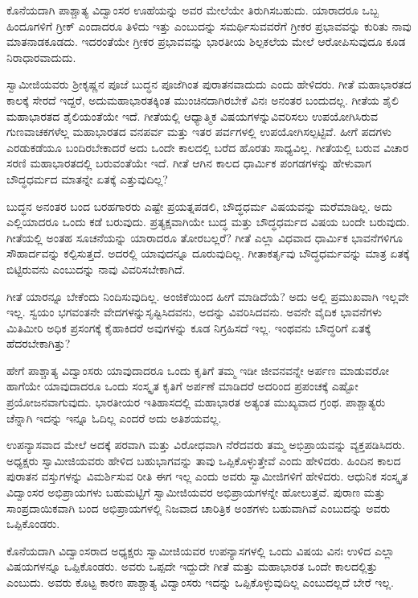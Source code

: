  ಕೊನೆಯದಾಗಿ ಪಾಶ್ಚಾತ್ಯ ವಿದ್ವಾಂಸರ ಊಹೆಯನ್ನು ಅವರ ಮೇಲೆಯೇ ತಿರುಗಿಸಬಹುದು. ಯಾರಾದರೂ ಒಬ್ಬ ಹಿಂದೂಗಳಿಗೆ ಗ್ರೀಕ್ ಎಂದಾದರೂ‌ ತಿಳಿದು ಇತ್ತು ಎಂಬುದನ್ನು ಸಮರ್ಥಿಸುವವರೆಗೆ ಗ್ರೀಕರ ಪ್ರಭಾವವನ್ನು ಕುರಿತು ನಾವು ಮಾತನಾಡಕೂಡದು. ಇದರಂತೆಯೇ ಗ್ರೀಕರ ಪ್ರಭಾವವನ್ನು ಭಾರತೀಯ ಶಿಲ್ಪಕಲೆಯ ಮೇಲೆ ಆರೋಪಿಸುವುದೂ ಕೂಡ ನಿರಾಧಾರವಾದುದು. 

 ಸ್ವಾಮೀಜಿಯವರು ಶ‍್ರೀಕೃಷ್ಣನ ಪೂಜೆ ಬುದ್ಧನ ಪೂಜೆಗಿಂತ ಪುರಾತನವಾದುದು ಎಂದು ಹೇಳಿದರು. ಗೀತೆ ಮಹಾಭಾರತದ ಕಾಲಕ್ಕೆ ಸೇರದೆ ಇದ್ದರೆ, ಅದು\break ಮಹಾಭಾರತಕ್ಕಿಂತ ಮುಂಚಿನದಾಗಿರಬೇಕೆ ವಿನಃ ಅನಂತರ ಬಂದುದಲ್ಲ. ಗೀತೆಯ ಶೈಲಿ ಮಹಾಭಾರತದ ಶೈಲಿಯಂತೆಯೇ ಇದೆ. ಗೀತೆಯಲ್ಲಿ ಆಧ್ಯಾತ್ಮಿಕ ವಿಷಯಗಳನ್ನು\break ವಿವರಿಸಲು ಉಪಯೋಗಿಸಿರುವ ಗುಣವಾಚಕಗಳೆಲ್ಲ ಮಹಾಭಾರತದ ವನಪರ್ವ ಮತ್ತು ಇತರ ಪರ್ವಗಳಲ್ಲಿ ಉಪಯೋಗಿಸಲ್ಪಟ್ಟಿವೆ. ಹೀಗೆ ಪದಗಳು ಎರಡುಕಡೆಯೂ ಬಂದಿರಬೇಕಾದರೆ ಅದು ಒಂದೇ ಕಾಲದಲ್ಲಿ ಬರೆದ ಹೊರತು ಸಾಧ್ಯವಿಲ್ಲ. ಗೀತೆಯಲ್ಲಿ ಬರುವ ವಿಚಾರ ಸರಣಿ ಮಹಾಭಾರತದಲ್ಲಿ ಬರುವಂತೆಯೇ ಇದೆ. ಗೀತೆ ಆಗಿನ ಕಾಲದ ಧಾರ್ಮಿಕ ಪಂಗಡಗಳನ್ನು ಹೇಳುವಾಗ ಬೌದ್ಧಧರ್ಮದ ಮಾತನ್ನೇ ಏತಕ್ಕೆ ಎತ್ತುವುದಿಲ್ಲ? 

 ಬುದ್ಧನ ಅನಂತರ ಬಂದ ಬರಹಗಾರರು ಎಷ್ಟೇ ಪ್ರಯತ್ನಪಡಲಿ, ಬೌದ್ಧಧರ್ಮ ವಿಷಯವನ್ನು ಮರೆಮಾಡಿಲ್ಲ. ಅದು ಎಲ್ಲಿಯಾದರೂ ಒಂದು ಕಡೆ ಬರುವುದು. ಪ್ರತ್ಯಕ್ಷವಾಗಿಯೇ ಬುದ್ಧ ಮತ್ತು ಬೌದ್ಧಧರ್ಮದ ವಿಷಯ ಬಂದೇ ಬರುವುದು. ಗೀತೆಯಲ್ಲಿ ಅಂತಹ ಸೂಚನೆಯನ್ನು ಯಾರಾದರೂ ತೋರಬಲ್ಲರೆ? ಗೀತೆ ಎಲ್ಲಾ ವಿಧವಾದ ಧಾರ್ಮಿಕ ಭಾವನೆಗಳಿಗೂ ಸೌಹಾರ್ದವನ್ನು ಕಲ್ಪಿಸುತ್ತದೆ. ಅದರಲ್ಲಿ ಯಾವುದನ್ನೂ ದೂರುವುದಿಲ್ಲ. ಗೀತಾಕರ್ತೃವು ಬೌದ್ಧಧರ್ಮವನ್ನು ಮಾತ್ರ ಏತಕ್ಕೆ ಬಿಟ್ಟಿರುವನು ಎಂಬುದನ್ನು ನಾವು ವಿವರಿಸಬೇಕಾಗಿದೆ.

 ಗೀತೆ ಯಾರನ್ನೂ ಬೇಕೆಂದು ನಿಂದಿಸುವುದಿಲ್ಲ. ಅಂಜಿಕೆಯಿಂದ ಹೀಗೆ ಮಾಡಿದೆಯೆ? ಅದು ಅಲ್ಲಿ ಪ್ರಮುಖವಾಗಿ ಇಲ್ಲವೇ ಇಲ್ಲ. ಸ್ವಯಂ ಭಗವಂತನೇ ವೇದಗಳನ್ನು\break ಸೃಷ್ಟಿಸಿದವನು, ಅದನ್ನು ವಿವರಿಸಿದವನು. ಅವನೇ ವೈದಿಕ ಭಾವನೆಗಳು ಮಿತಿಮೀರಿ ಅಧಿಕ ಪ್ರಸಂಗಕ್ಕೆ ಕೈಹಾಕಿದರೆ ಅವುಗಳನ್ನು ಕೂಡ ನಿಗ್ರಹಿಸದೆ ಇಲ್ಲ. ಇಂಥವನು ಬೌದ್ಧರಿಗೆ ಏತಕ್ಕೆ ಹೆದರಬೇಕಾಗಿತ್ತು? 

 ಹೇಗೆ ಪಾಶ್ಚಾತ್ಯ ವಿದ್ವಾಂಸರು ಯಾವುದಾದರೂ ಒಂದು ಕೃತಿಗೆ ತಮ್ಮ ಇಡೀ ಜೀವನವನ್ನೇ ಅರ್ಪಣ ಮಾಡುವರೋ ಹಾಗೆಯೇ ಯಾವುದಾದರೂ ಒಂದು ಸಂಸ್ಕೃತ ಕೃತಿಗೆ ಅರ್ಪಣೆ ಮಾಡಿದರೆ ಅದರಿಂದ ಪ್ರಪಂಚಕ್ಕೆ ಎಷ್ಟೋ ಪ್ರಯೋಜನವಾಗುವುದು. ಭಾರತೀಯರ ಇತಿಹಾಸದಲ್ಲಿ ಮಹಾಭಾರತ ಅತ್ಯಂತ ಮುಖ್ಯವಾದ ಗ್ರಂಥ. ಪಾಶ್ಚಾತ್ಯರು ಚೆನ್ನಾಗಿ ಇದನ್ನು ಇನ್ನೂ ಓದಿಲ್ಲ ಎಂದರೆ ಅದು ಅತಿಶಯವಲ್ಲ. 

 ಉಪನ್ಯಾಸವಾದ ಮೇಲೆ ಅದಕ್ಕೆ ಪರವಾಗಿ ಮತ್ತು ವಿರೋಧವಾಗಿ ನೆರೆದವರು ತಮ್ಮ ಅಭಿಪ್ರಾಯವನ್ನು ವ್ಯಕ್ತಪಡಿಸಿದರು. ಅಧ್ಯಕ್ಷರು ಸ್ವಾಮೀಜಿಯವರು ಹೇಳಿದ ಬಹುಭಾಗವನ್ನು ತಾವು ಒಪ್ಪಿಕೊಳ್ಳುತ್ತೇವೆ ಎಂದು ಹೇಳಿದರು. ಹಿಂದಿನ ಕಾಲದ ಪುರಾತನ ವಸ್ತುಗಳನ್ನು ವಿಮರ್ಶಿಸುವ ರೀತಿ ಈಗ ಇಲ್ಲ ಎಂದು ಅವರು ಸ್ವಾಮೀಜಿಗಳಿಗೆ ಹೇಳಿದರು. ಆಧುನಿಕ ಸಂಸ್ಕೃತ ವಿದ್ವಾಂಸರ ಅಭಿಪ್ರಾಯಗಳು ಬಹುಮಟ್ಟಿಗೆ ಸ್ವಾಮೀಜಿಯವರ ಅಭಿಪ್ರಾಯಗಳನ್ನೇ ಹೋಲುತ್ತವೆ. ಪುರಾಣ ಮತ್ತು ಸಾಂಪ್ರದಾಯಿಕವಾಗಿ ಬಂದ ಅಭಿಪ್ರಾಯಗಳಲ್ಲಿ ನಿಜವಾದ ಚಾರಿತ್ರಿಕ ಅಂಶಗಳು ಬಹುವಾಗಿವೆ ಎಂಬುದನ್ನು ಅವರು ಒಪ್ಪಿಕೊಂಡರು. 

 ಕೊನೆಯದಾಗಿ ವಿದ್ವಾಂಸರಾದ ಅಧ್ಯಕ್ಷರು ಸ್ವಾಮೀಜಿಯವರ ಉಪನ್ಯಾಸಗಳಲ್ಲಿ ಒಂದು ವಿಷಯ ವಿನಃ ಉಳಿದ ಎಲ್ಲಾ ವಿಷಯಗಳನ್ನೂ ಒಪ್ಪಿಕೊಂಡರು. ಅವರು ಒಪ್ಪದೇ ಇದ್ದುದೇ ಗೀತೆ ಮತ್ತು ಮಹಾಭಾರತ ಒಂದೇ ಕಾಲದಲ್ಲಿತ್ತು ಎಂಬುದು. ಅವರು ಕೊಟ್ಟ ಕಾರಣ ಪಾಶ್ಚಾತ್ಯ ವಿದ್ವಾಂಸರು ಇದನ್ನು ಒಪ್ಪಿಕೊಳ್ಳುವುದಿಲ್ಲ ಎಂಬುದಲ್ಲದೆ ಬೇರೆ ಇಲ್ಲ. 

